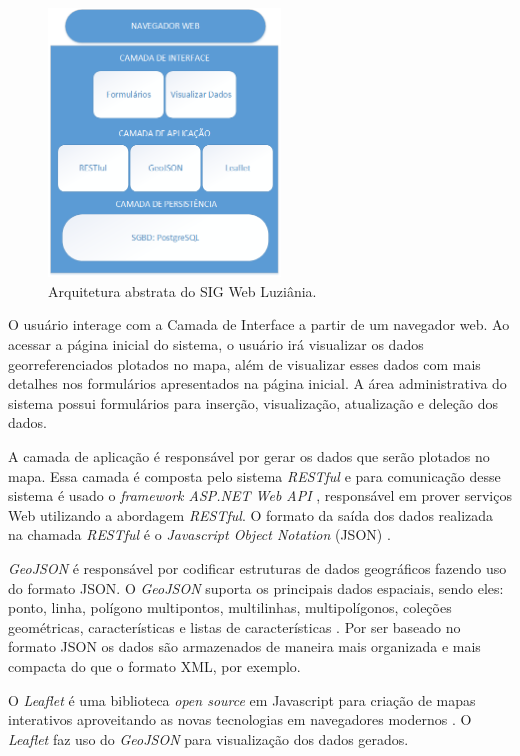 \newpage

\begin{figure}[h]
\centering
\includegraphics[width=0.55\textwidth]{./img/cap_IV/3-ArquiteturasSigLuziania}
\caption{Arquitetura abstrata do SIG Web Luziânia.}
\label{fig:arquiSig}
\end{figure}

O usuário interage com a Camada de Interface a partir de um navegador web. Ao acessar a página inicial do sistema, o usuário irá visualizar os dados georreferenciados plotados no mapa, além de visualizar esses dados com mais detalhes nos formulários apresentados na página inicial. A área administrativa do sistema possui formulários para inserção, visualização, atualização e deleção dos dados.

A camada de aplicação é responsável por gerar os dados que serão plotados no mapa. Essa camada é composta pelo sistema \textit{RESTful} \cite{restful} e para comunicação desse sistema é usado o \textit{framework ASP.NET Web API} \cite{webapi}, responsável em prover serviços Web utilizando a abordagem \textit{RESTful}. O formato da saída dos dados realizada na chamada \textit{RESTful} é o \textit{Javascript Object Notation} (JSON) \cite{json}.

\textit{GeoJSON} é responsável por codificar estruturas de dados geográficos fazendo uso do formato JSON. O \textit{GeoJSON} suporta os principais dados espaciais, sendo eles: ponto, linha, polígono multipontos, multilinhas, multipolígonos, coleções geométricas, características e listas de características \cite{geojson}. Por ser baseado no formato JSON os dados são armazenados de maneira mais organizada e mais compacta do que o formato XML, por exemplo.

O \textit{Leaflet} é uma biblioteca \textit{open source} em Javascript para criação de mapas interativos aproveitando as novas tecnologias em navegadores modernos \cite{leaflet}. O \textit{Leaflet} faz uso do \textit{GeoJSON} para visualização dos dados gerados.

